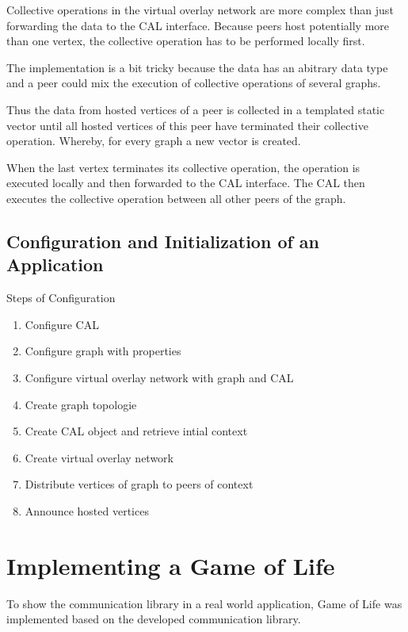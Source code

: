 \begin{itemize}
  Collective operations in the virtual overlay network are more
  complex than just forwarding the data to the CAL interface. Because
  peers host potentially more than one vertex, the collective
  operation has to be performed locally first.

  The implementation is a bit tricky because the data has an abitrary
  data type and a peer could mix the execution of collective
  operations of several graphs.

  Thus the data from hosted vertices of a peer is collected in a
  templated static vector until all hosted vertices of this peer have
  terminated their collective operation. Whereby, for every graph a
  new vector is created.

  When the last vertex terminates its collective operation, the
  operation is executed locally and then forwarded to the CAL
  interface. The CAL then executes the collective operation between
  all other peers of the graph.


\end{itemize}

\subsection{Configuration and Initialization of an Application}

Steps of Configuration

\begin{enumerate}
\item Configure CAL
\item Configure graph with properties
\item Configure virtual overlay network with graph and CAL

\item Create graph topologie
\item Create CAL object and retrieve intial context
\item Create virtual overlay network

\item Distribute vertices of graph to peers of context
\item Announce hosted vertices
\end{enumerate}

\section{Implementing a Game of Life}
\label{sec:gol_imp}
To show the communication library in a real world application, Game of
Life was implemented based on the developed communication library.


